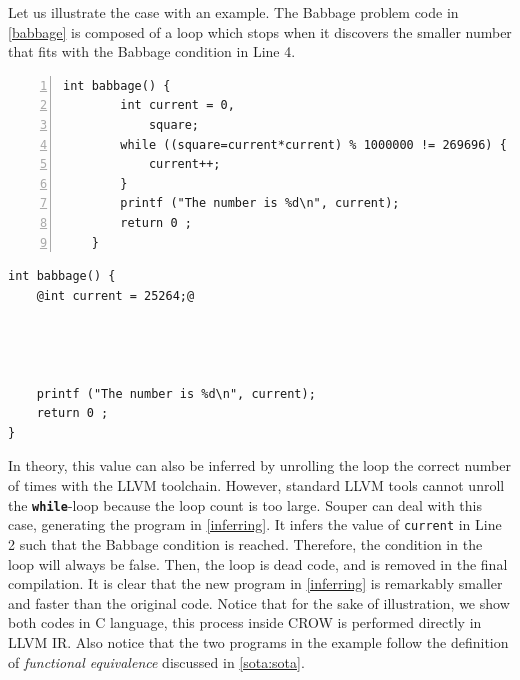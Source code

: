 Let us illustrate the case with an example.
The Babbage problem code in \autoref{babbage} is composed of a loop which stops when it discovers the smaller number that fits with the Babbage condition in Line 4.


{


\begin{minipage}[t]{0.5\linewidth}
    \begin{lstlisting}[numbers=left]
    int babbage() {
        int current = 0,
            square;
        while ((square=current*current) % 1000000 != 269696) {
            current++;
        }
        printf ("The number is %d\n", current);
        return 0 ;
    }
    \end{lstlisting}
\end{minipage}
\begin{minipage}[t]{0.5\linewidth}
    \begin{lstlisting}[]
int babbage() {
    @int current = 25264;@
    
    


    printf ("The number is %d\n", current);
    return 0 ;
}
    \end{lstlisting}
\end{minipage}
}
In theory, this value can also be inferred by unrolling the loop the correct number of times with the LLVM toolchain.
However, standard LLVM tools cannot unroll the \texttt{\textbf{while}}-loop because the loop count is too large.
Souper can deal with this case, generating the program in \autoref{inferring}. It infers the value of \texttt{current} in Line 2 such that the Babbage condition is reached. Therefore, the condition in the loop will always be false. Then, the loop is dead code, and is removed in the final compilation. It is clear that the new program in \autoref{inferring} is remarkably smaller and faster than the original code. Notice that for the sake of illustration, we show both codes in C language, this process inside CROW is performed directly in LLVM IR. Also notice that the two programs in the example follow the definition of \emph{functional equivalence} discussed in \autoref{sota:sota}.


